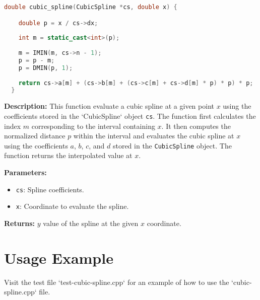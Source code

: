 \documentclass{article}
\begin{document}
\begin{lstlisting}[language=C++]
double cubic_spline(CubicSpline *cs, double x) {

    double p = x / cs->dx;
  
    int m = static_cast<int>(p);
  
    m = IMIN(m, cs->n - 1);
    p = p - m;
    p = DMIN(p, 1);
  
    return cs->a[m] + (cs->b[m] + (cs->c[m] + cs->d[m] * p) * p) * p;
  }
\end{lstlisting}

\textbf{Description:} This function evaluate a cubic spline at a given point $x$ using the coefficients stored in the `CubicSpline` object \texttt{cs}. The function first calculates the index $m$ corresponding to the interval containing $x$. It then computes the normalized distance $p$ within the interval and evaluates the cubic spline at $x$ using the coefficients $a$, $b$, $c$, and $d$ stored in the \texttt{CubicSpline} object. The function returns the interpolated value at $x$.

\textbf{Parameters:}
\begin{itemize}
    \item \texttt{cs}: Spline coefficients.
    \item \texttt{x}: Coordinate to evaluate the spline.
\end{itemize}

\textbf{Returns:} $y$ value of the spline at the given $x$ coordinate.


\section{Usage Example}
Visit the test file `test-cubic-spline.cpp` for an example of how to use the `cubic-spline.cpp` file.
\end{document}
